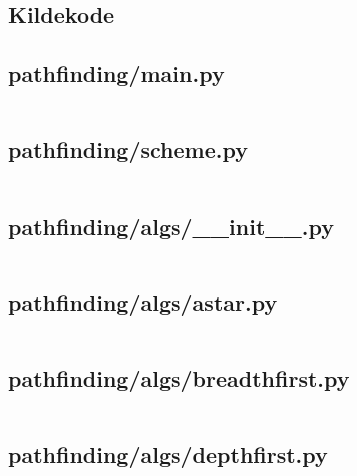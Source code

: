 \documentclass[a4paper, 12pt]{article}
\begin{document}
\newpage
\setlength\bibitemsep{10pt}
\printbibliography[
heading=bibintoc, %
title={Litteratur}, %
]


\newpage
\begin{appendices}
    \section{Kildekode}

    \subsection{pathfinding/main.py}
    \inputminted[python3, linenos, breaklines, frame=lines, fontsize=\footnotesize]{python}{../pathfinding/main.py}

    \subsection{pathfinding/scheme.py}
    \inputminted[python3, linenos, breaklines, frame=lines, fontsize=\footnotesize]{python}{../pathfinding/scheme.py}

    \subsection{pathfinding/algs/\_\_init\_\_.py}
    \inputminted[python3, linenos, breaklines, frame=lines, fontsize=\footnotesize]{python}{../pathfinding/algs/__init__.py}

    \subsection{pathfinding/algs/astar.py}
    \inputminted[python3, linenos, breaklines, frame=lines, fontsize=\footnotesize]{python}{../pathfinding/algs/astar.py}

    \subsection{pathfinding/algs/breadthfirst.py}
    \inputminted[python3, linenos, breaklines, frame=lines, fontsize=\footnotesize]{python}{../pathfinding/algs/breadthfirst.py}

    \subsection{pathfinding/algs/depthfirst.py}
    \inputminted[python3, linenos, breaklines, frame=lines, fontsize=\footnotesize]{python}{../pathfinding/algs/depthfirst.py}


\end{appendices}
\end{document}
